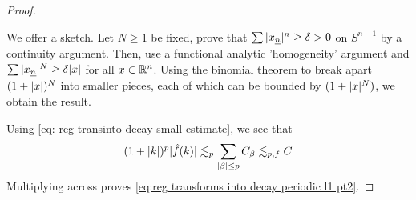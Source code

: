 \documentclass[../main-v2-manifolds.tex]{subfiles}
\begin{document}
\begin{proof}
    \begin{note}
        We offer a sketch. Let $N\geq 1$ be fixed, prove that $\sum \vert {x_{\underline{n}}} \vert^n\geq \delta> 0$ on $S^{n-1}$ by a continuity argument. Then, use a functional analytic 'homogeneity' argument and $\sum \vert {x_{\underline{n}}} \vert^N \geq \delta\vert {x} \vert$ for all $x\in{\mathbb{R}^n}$. Using the binomial theorem to break apart $(1+\vert {x} \vert)^N$ into smaller pieces, each of which can be bounded by $(1+\vert {x} \vert^N)$, we obtain the result.
    \end{note}
    Using \cref{eq: reg transinto decay small estimate}, we see that
    \[
        (1+\vert {k} \vert)^p\vert {\hat{f}(k)} \vert\lesssim_p\sum_{\vert {\beta} \vert\leq p}C_{\beta}\lesssim_{p,f} C
    \]
    Multiplying across proves \cref{eq:reg transforms into decay periodic l1 pt2}.
\end{proof}
\end{document}
